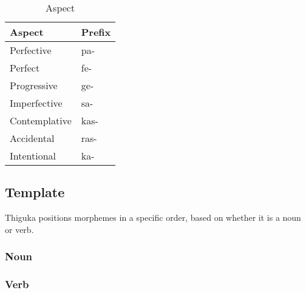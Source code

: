 \begin{table}[h!]
    \centering
    \begin{tabularx}{8cm}{|X|X|}
        \hline
        \textbf{Aspect} & \textbf{Prefix} \\
        \hline
        Perfective & pa- \\
        Perfect & fe- \\
        Progressive & ge- \\
        Imperfective & sa- \\
        Contemplative & kas- \\
        Accidental & ras- \\
        Intentional & ka- \\
        \hline
    \end{tabularx}
    \caption{Aspect}
\end{table}
\subsection{Template}
Thiguka positions morphemes in a specific order, based on whether it is a noun or verb.

\subsubsection{Noun}


\subsubsection{Verb}
